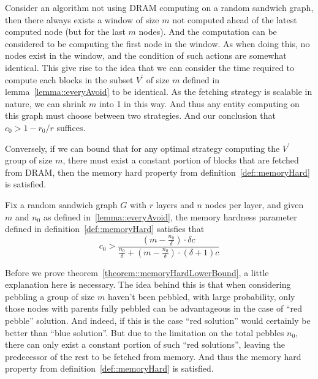 Consider an algorithm not using DRAM computing on a random sandwich graph, then there always exists a window of size $m$ not computed ahead of
the latest computed node (but for the last $m$ nodes). And the computation can be considered to be computing the first node in the window.
As when doing this, no nodes exist in the window, and the condition of such actions are somewhat identical. 
%
This give rise to the idea that we can consider the time required to compute each blocks in the subset $V^\prime$ of size $m$ defined in 
lemma~\ref{lemma::everyAvoid} to be identical. As the fetching strategy is scalable in nature, we can shrink $m$ into 1 in this way.
And thus any entity computing on this graph must choose between two strategies. And our conclusion that $c_0 > 1 - r_0/r$ suffices.

Conversely, if we can bound that for any optimal strategy computing the $V^\prime$ group of size $m$, there must exist a constant portion of blocks that
are fetched from DRAM, then the memory hard property from definition~\ref{def::memoryHard} is satisfied.

\begin{theorem}\label{theorem::memoryHardLowerBound}
  Fix a random sandwich graph $G$ with $r$ layers and $n$ nodes per layer, and given $m$ and $n_0$ as defined in~\ref{lemma::everyAvoid}, the
  memory hardness parameter defined in definition~\ref{def::memoryHard} satisfies that
  \begin{equation}
    c_0 > \frac{(m - \frac{n_0}{\delta}) \cdot \delta c}{\frac{n_0}{\delta} + (m - \frac{n_0}{\delta}) \cdot (\delta + 1)c}
  \end{equation}
\end{theorem}

Before we prove theorem~\ref{theorem::memoryHardLowerBound}, a little explanation here is necessary. The idea behind this is that
when considering pebbling a group of size $m$ haven't been pebbled, with large probability, only those nodes with parents fully
pebbled can be advantageous in the case of ``red pebble'' solution. And indeed, if this is the case ``red solution'' would
certainly be better than ``blue solution''. But due to the limitation on the total pebbles $n_0$, there can only exist a constant
portion of such ``red solutions'', leaving the predecessor of the rest to be fetched from memory. And thus the memory hard property
from definition~\ref{def::memoryHard} is satisfied.

